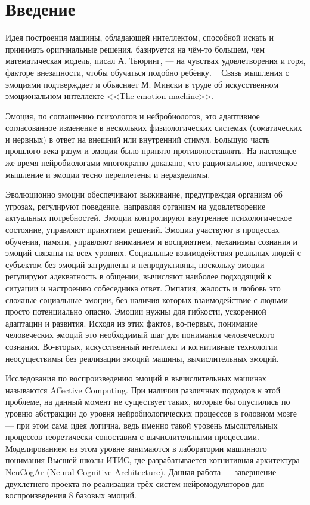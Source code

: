 \cleardoublepage
{}
{}
\chapter*{Введение}
\label{chap:introduction}
Идея построения машины, обладающей интеллектом, способной искать и принимать оригинальные решения, базируется на чём-то большем, чем математическая модель, писал А. Тьюринг, — на чувствах удовлетворения и горя, факторе внезапности, чтобы обучаться подобно ребёнку. ~\cite{intelligent_machinery} Связь мышления с эмоциями подтверждает и объясняет М. Мински в труде об искусственном эмоциональном интеллекте <<The emotion machine>>.~\cite{minsky2007}


Эмоция, по соглашению психологов и нейробиологов, это адаптивное согласованное изменение в нескольких физиологических системах (соматических и нервных) в ответ на внешний или внутренний стимул.\cite{plutchik2001} Большую часть прошлого века разум и эмоции было принято противопоставлять. На настоящее же время нейробиологами многократно доказано, что рациональное, логическое мышление и эмоции тесно переплетены и неразделимы.\cite{Brosch, ziemke-role, damasio2008, damasio1994}


Эволюционно эмоции обеспечивают выживание, предупреждая  организм об угрозах, регулируют поведение, направляя организм на удовлетворение актуальных потребностей.\cite{whoneedsemotions} Эмоции контролируют внутреннее психологическое состояние, управляют принятием решений.\cite{roleofemotions} Эмоции участвуют в процессах обучения, памяти, управляют вниманием и восприятием, механизмы сознания и эмоций связаны на всех уровнях.\cite{Phelps2006} Социальные взаимодействия реальных людей с субъектом без эмоций затруднены и непродуктивны, поскольку эмоции регулируют адекватность в общении, вычисляют наиболее подходящий к ситуации и настроению собеседника ответ. Эмпатия, жалость и любовь это сложные социальные эмоции, без наличия которых взаимодействие с людьми просто потенциально опасно. Эмоции нужны для гибкости, ускоренной адаптации и развития. Исходя из этих фактов, во-первых, понимание человеческих эмоций это необходимый шаг для понимания человеческого сознания. Во-вторых, искусственный интеллект и когнитивные технологии неосуществимы без реализации эмоций машины, вычислительных эмоций.\cite{affectivecomputingchallenges}


Исследования по воспроизведению эмоций в вычислительных машинах называются Affective Computing. При наличии различных подходов к этой проблеме, на данный момент не существует таких, которые бы опустились по уровню абстракции до уровня нейробиологических процессов в головном мозге — при этом сама идея логична, ведь именно такой уровень мыслительных процессов теоретически сопоставим с вычислительными процессами. Моделированием на этом уровне занимаются в лаборатории машинного понимания Высшей школы ИТИС, где разрабатывается когнитивная архитектура NeuCogAr (Neural Cognitive Architecture). Данная работа — завершение двухлетнего проекта по реализации трёх систем нейромодуляторов для воспроизведения 8 базовых эмоций.


